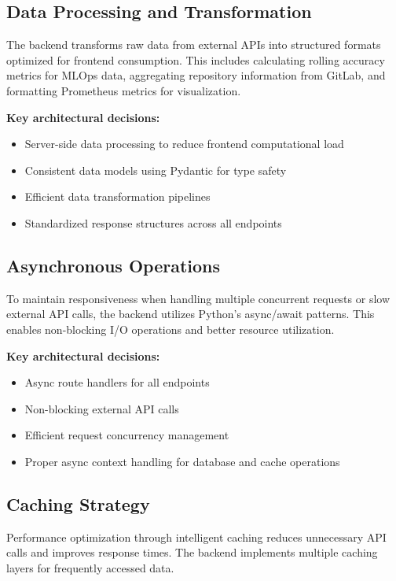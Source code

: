 \subsection{Data Processing and Transformation}

The backend transforms raw data from external APIs into structured formats optimized for frontend consumption. This includes calculating rolling accuracy metrics for MLOps data, aggregating repository information from GitLab, and formatting Prometheus metrics for visualization.

\textbf{Key architectural decisions:}
\begin{itemize}
    \item Server-side data processing to reduce frontend computational load
    \item Consistent data models using Pydantic for type safety
    \item Efficient data transformation pipelines
    \item Standardized response structures across all endpoints
\end{itemize}

\subsection{Asynchronous Operations}

To maintain responsiveness when handling multiple concurrent requests or slow external API calls, the backend utilizes Python's async/await patterns. This enables non-blocking I/O operations and better resource utilization.

\textbf{Key architectural decisions:}
\begin{itemize}
    \item Async route handlers for all endpoints
    \item Non-blocking external API calls
    \item Efficient request concurrency management
    \item Proper async context handling for database and cache operations
\end{itemize}

\subsection{Caching Strategy}

Performance optimization through intelligent caching reduces unnecessary API calls and improves response times. The backend implements multiple caching layers for frequently accessed data.

